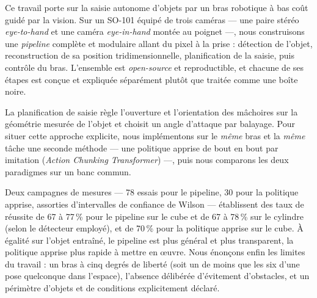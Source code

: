 Ce travail porte sur la saisie autonome d'objets par un bras robotique à bas coût guidé par la vision. Sur un SO-101 équipé de trois caméras --- une paire stéréo \emph{eye-to-hand} et une caméra \emph{eye-in-hand} montée au poignet ---, nous construisons une \emph{pipeline} complète et modulaire allant du pixel à la prise : détection de l'objet, reconstruction de sa position tridimensionnelle, planification de la saisie, puis contrôle du bras. L'ensemble est \emph{open-source} et reproductible, et chacune de ses étapes est conçue et expliquée séparément plutôt que traitée comme une boîte noire.

La planification de saisie règle l'ouverture et l'orientation des mâchoires sur la géométrie mesurée de l'objet et choisit un angle d'attaque par balayage. Pour situer cette approche explicite, nous implémentons sur le \emph{même} bras et la \emph{même} tâche une seconde méthode --- une politique apprise de bout en bout par imitation (\textit{Action Chunking Transformer}) ---, puis nous comparons les deux paradigmes sur un banc commun.

Deux campagnes de mesures --- 78 essais pour le pipeline, 30 pour la politique apprise, assorties d'intervalles de confiance de Wilson --- établissent des taux de réussite de 67 à 77\,\% pour le pipeline sur le cube et de 67 à 78\,\% sur le cylindre (selon le détecteur employé), et de 70\,\% pour la politique apprise sur le cube. À égalité sur l'objet entraîné, le pipeline est plus général et plus transparent, la politique apprise plus rapide à mettre en œuvre. Nous énonçons enfin les limites du travail : un bras à cinq degrés de liberté (soit un de moins que les six d'une pose quelconque dans l'espace), l'absence délibérée d'évitement d'obstacles, et un périmètre d'objets et de conditions explicitement déclaré.
